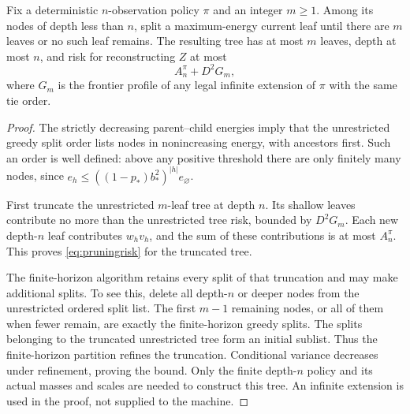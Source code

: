 \begin{lemma}\label{lem:causalpruning}
Fix a deterministic $n$-observation policy $\pi$ and an integer $m\ge1$. Among its nodes of depth less than $n$, split a maximum-energy current leaf until there are $m$ leaves or no such leaf remains. The resulting tree has at most $m$ leaves, depth at most $n$, and risk for reconstructing $Z$ at most
\begin{equation}\label{eq:pruningrisk}
 A_n^\pi+D^2G_m,
\end{equation}
where $G_m$ is the frontier profile of any legal infinite extension of $\pi$ with the same tie order.
\end{lemma}
\begin{proof}
The strictly decreasing parent--child energies imply that the unrestricted greedy split order lists nodes in nonincreasing energy, with ancestors first. Such an order is well defined: above any positive threshold there are only finitely many nodes, since $e_h\le((1-p_*)b_*^2)^{|h|}e_\varnothing$.

First truncate the unrestricted $m$-leaf tree at depth $n$. Its shallow leaves contribute no more than the unrestricted tree risk, bounded by $D^2G_m$. Each new depth-$n$ leaf contributes $w_hv_h$, and the sum of these contributions is at most $A_n^\pi$. This proves \eqref{eq:pruningrisk} for the truncated tree.

The finite-horizon algorithm retains every split of that truncation and may make additional splits. To see this, delete all depth-$n$ or deeper nodes from the unrestricted ordered split list. The first $m-1$ remaining nodes, or all of them when fewer remain, are exactly the finite-horizon greedy splits. The splits belonging to the truncated unrestricted tree form an initial sublist. Thus the finite-horizon partition refines the truncation. Conditional variance decreases under refinement, proving the bound. Only the finite depth-$n$ policy and its actual masses and scales are needed to construct this tree. An infinite extension is used in the proof, not supplied to the machine.
\end{proof}

